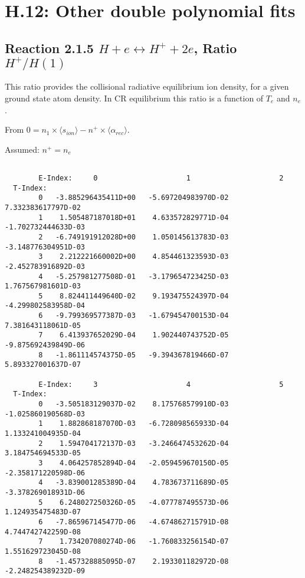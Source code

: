 \documentclass[12pt,dvipdfmx]{article}
\begin{document}
{\newpage

\section{H.12: Other double polynomial fits}

\subsection{
Reaction 2.1.5   $H + e \leftrightarrow H^+ +2e$,  Ratio $H^+/H(1)$
}
This ratio provides the collisional radiative equilibrium ion
density, for a given ground state atom density.
In CR equilibrium this ratio is a function of $T_e$ and $n_e$.

From $0 = n_1 \times  \langle s_{ion} \rangle - n^+ \times \langle\alpha_{rec} \rangle$.

Assumed:  $n^+ = n_e$
\begin{small}\begin{verbatim}

        E-Index:     0                     1                     2
  T-Index:
        0   -3.885296435411D+00   -5.697204983970D-02    7.332383617797D-02
        1    1.505487187018D+01    4.633572829771D-04   -1.702732444633D-03
        2   -6.749191912028D+00    1.050145613783D-03   -3.148776304951D-03
        3    2.212221660002D+00    4.854461323593D-03   -2.452783916892D-03
        4   -5.257981277508D-01   -3.179654723425D-03    1.767567981601D-03
        5    8.824411449640D-02    9.193475524397D-04   -4.299802583958D-04
        6   -9.799369577387D-03   -1.679454700153D-04    7.381643118061D-05
        7    6.413937652029D-04    1.902440743752D-05   -9.875692439849D-06
        8   -1.861114574375D-05   -9.394367819466D-07    5.893327001637D-07

        E-Index:     3                     4                     5
  T-Index:
        0   -3.505183129037D-02    8.175768579910D-03   -1.025860190568D-03
        1    1.882868187070D-03   -6.728098565933D-04    1.133241004935D-04
        2    1.594704172137D-03   -3.246647453262D-04    3.184754694533D-05
        3    4.064257852894D-04   -2.059459670150D-05   -2.358171220598D-06
        4   -3.839001285389D-04    4.783673711689D-05   -3.378269018931D-06
        5    6.248027250326D-05   -4.077787495573D-06    1.124935475483D-07
        6   -7.865967145477D-06   -4.674862715791D-08    4.744742742259D-08
        7    1.734207080274D-06   -1.760833256154D-07    1.551629723045D-08
        8   -1.457328885095D-07    2.193301182972D-08   -2.248254389232D-09


\end{verbatim}
\end{small}}
\end{document}
